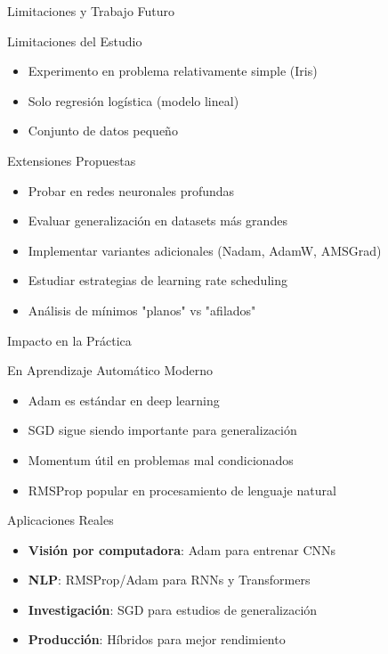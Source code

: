 \documentclass[10pt]{beamer}
\begin{document}
\begin{frame}{Limitaciones y Trabajo Futuro}
\begin{block}{Limitaciones del Estudio}
\begin{itemize}
\item Experimento en problema relativamente simple (Iris)
\item Solo regresión logística (modelo lineal)
\item Conjunto de datos pequeño
\end{itemize}
\end{block}

\begin{block}{Extensiones Propuestas}
\begin{itemize}
\item Probar en redes neuronales profundas
\item Evaluar generalización en datasets más grandes
\item Implementar variantes adicionales (Nadam, AdamW, AMSGrad)
\item Estudiar estrategias de learning rate scheduling
\item Análisis de mínimos "planos" vs "afilados"
\end{itemize}
\end{block}
\end{frame}

\begin{frame}{Impacto en la Práctica}
\begin{block}{En Aprendizaje Automático Moderno}
\begin{itemize}
\item Adam es estándar en deep learning
\item SGD sigue siendo importante para generalización
\item Momentum útil en problemas mal condicionados
\item RMSProp popular en procesamiento de lenguaje natural
\end{itemize}
\end{block}

\begin{exampleblock}{Aplicaciones Reales}
\begin{itemize}
\item \textbf{Visión por computadora}: Adam para entrenar CNNs
\item \textbf{NLP}: RMSProp/Adam para RNNs y Transformers
\item \textbf{Investigación}: SGD para estudios de generalización
\item \textbf{Producción}: Híbridos para mejor rendimiento
\end{itemize}
\end{exampleblock}
\end{frame}
\end{document}
